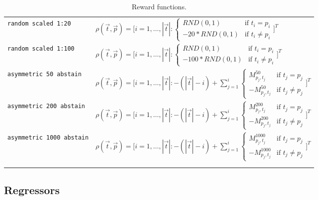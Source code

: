 \documentclass[twoside,11pt]{article}
\begin{document}
\begin{longtabu}{p{3cm}X}
    \texttt{random scaled 1:20}
    &$\rho(\vec{t}, \vec{p}) = \Bigg[
      i=1,\dots,|\vec{t}|:
      \begin{cases}
        RND(0,1)  &\text{if } t_i = p_i \\
        -20 * RND(0,1) &\text{if } t_i \neq p_i
      \end{cases} \Bigg]^T$\\

    \texttt{random scaled 1:100}
    &$\rho(\vec{t}, \vec{p}) = \Bigg[
      i=1,\dots,|\vec{t}|:
      \begin{cases}
        RND(0,1)  &\text{if } t_i = p_i \\
        -100 * RND(0,1) &\text{if } t_i \neq p_i
      \end{cases} \Bigg]^T$\\

    \texttt{asymmetric 50 abstain}
    &$\rho(\vec{t}, \vec{p}) = \Bigg[
      i=1,\dots,|\vec{t}|: -(|\vec{t}| - i)+\sum_{j=1}^{i}
      \begin{cases}
        M^{50}_{p_j,t_j}  &\text{if } t_j = p_j \\
        -M^{50}_{p_j,t_j} &\text{if } t_j \neq p_j
      \end{cases} \Bigg]^T$\\

    \texttt{asymmetric 200 abstain}
    &$\rho(\vec{t}, \vec{p}) = \Bigg[
      i=1,\dots,|\vec{t}|: -(|\vec{t}| - i)+\sum_{j=1}^{i}
      \begin{cases}
        M^{200}_{p_j,t_j}  &\text{if } t_j = p_j \\
        -M^{200}_{p_j,t_j} &\text{if } t_j \neq p_j
      \end{cases} \Bigg]^T$\\

    \texttt{asymmetric 1000 abstain}
    &$\rho(\vec{t}, \vec{p}) = \Bigg[
      i=1,\dots,|\vec{t}|: -(|\vec{t}| - i)+\sum_{j=1}^{i}
      \begin{cases}
        M^{1000}_{p_j,t_j}  &\text{if } t_j = p_j \\
        -M^{1000}_{p_j,t_j} &\text{if } t_j \neq p_j
      \end{cases} \Bigg]^T$\\ \\

  \caption{Reward functions.}
  \label{tab:rew_fns}
\end{longtabu}


\subsection{Regressors}
\end{document}
